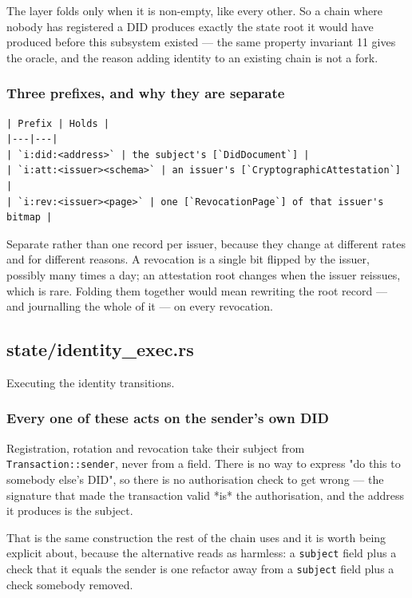 \documentclass[11pt,a4paper]{article}
\begin{document}
The layer folds only when it is non-empty, like every other. So a chain
where nobody has registered a DID produces exactly the state root it would
have produced before this subsystem existed — the same property invariant 11
gives the oracle, and the reason adding identity to an existing chain is not
a fork.

\subsubsection{Three prefixes, and why they are separate}

\begin{verbatim}
| Prefix | Holds |
|---|---|
| `i:did:<address>` | the subject's [`DidDocument`] |
| `i:att:<issuer><schema>` | an issuer's [`CryptographicAttestation`] |
| `i:rev:<issuer><page>` | one [`RevocationPage`] of that issuer's bitmap |
\end{verbatim}

Separate rather than one record per issuer, because they change at different
rates and for different reasons. A revocation is a single bit flipped by the
issuer, possibly many times a day; an attestation root changes when the
issuer reissues, which is rare. Folding them together would mean rewriting
the root record — and journalling the whole of it — on every revocation.

\subsection{state/identity\_exec.rs}
Executing the identity transitions.

\subsubsection{Every one of these acts on the sender's own DID}

Registration, rotation and revocation take their subject from
\texttt{Transaction::sender}, never from a field. There is no way to express "do
this to somebody else's DID", so there is no authorisation check to get
wrong — the signature that made the transaction valid *is* the
authorisation, and the address it produces is the subject.

That is the same construction the rest of the chain uses and it is worth
being explicit about, because the alternative reads as harmless: a \texttt{subject}
field plus a check that it equals the sender is one refactor away from a
\texttt{subject} field plus a check somebody removed.
\end{document}
